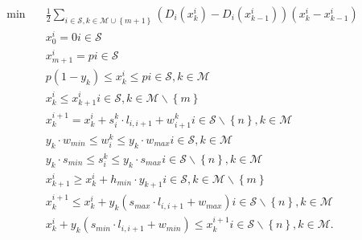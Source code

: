 \begin{align}
  \min\quad & \frac{1}{2} \sum_{i \in \mathcal{S}, k \in \mathcal{M} \cup \left\{m + 1\right\}} \left(D_{i} \left(x_{k}^{i}\right) - D_{i} \left(x_{k - 1}^{i}\right)\right) \left(x_{k}^{i} - x_{k - 1}^{i}\right) \tag{eq\_0001} \\
  & x_{0}^{i} = 0 i \in \mathcal{S} \tag{eq\_0002} \\
  & x_{m + 1}^{i} = p i \in \mathcal{S} \tag{eq\_0003} \\
  & p \left(1 - y_{k}\right) \leq x_{k}^{i} \leq p i \in \mathcal{S} , k \in \mathcal{M} \tag{eq\_0004} \\
  & x_{k}^{i} \leq x_{k + 1}^{i} i \in \mathcal{S} , k \in \mathcal{M} \backslash \left\{m\right\} \tag{eq\_0005} \\
  & x_{k}^{i + 1} = x_{k}^{i} + s_{i}^{k} \cdot l_{i , i + 1} + w_{i + 1}^{k} i \in \mathcal{S} \backslash \left\{n\right\} , k \in \mathcal{M} \tag{eq\_0006} \\
  & y_{k} \cdot w_{\mathit{min}} \leq w_{i}^{k} \leq y_{k} \cdot w_{\mathit{max}} i \in \mathcal{S} , k \in \mathcal{M} \tag{eq\_0007} \\
  & y_{k} \cdot s_{\mathit{min}} \leq s_{i}^{k} \leq y_{k} \cdot s_{\mathit{max}} i \in \mathcal{S} \backslash \left\{n\right\} , k \in \mathcal{M} \tag{eq\_0008} \\
  & x_{k + 1}^{i} \geq x_{k}^{i} + h_{\mathit{min}} \cdot y_{k + 1} i \in \mathcal{S} , k \in \mathcal{M} \backslash \left\{m\right\} \tag{eq\_0009} \\
  & x_{k}^{i + 1} \leq x_{k}^{i} + y_{k} \left(s_{\mathit{max}} \cdot l_{i , i + 1} + w_{\mathit{max}}\right) i \in \mathcal{S} \backslash \left\{n\right\} , k \in \mathcal{M} \tag{eq\_0013} \\
  & x_{k}^{i} + y_{k} \left(s_{\mathit{min}} \cdot l_{i , i + 1} + w_{\mathit{min}}\right) \leq x_{k}^{i + 1} i \in \mathcal{S} \backslash \left\{n\right\} , k \in \mathcal{M} . \tag{eq\_0014} \\
\end{align}
